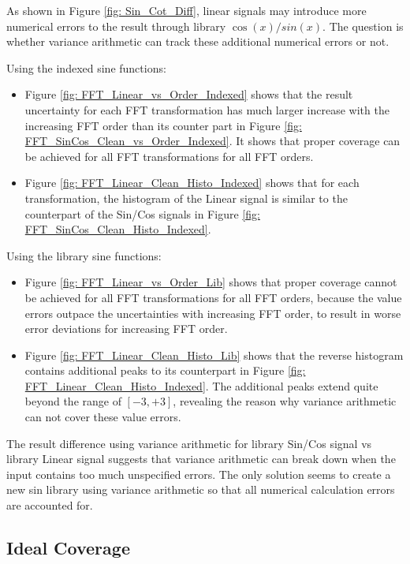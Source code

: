 \documentclass[twoside]{article}
\numberwithin{equation}{section}
\begin{document}
As shown in Figure \ref{fig: Sin_Cot_Diff}, linear signals may introduce more numerical errors to the result through library $\cos(x)/sin(x)$.
The question is whether variance arithmetic can track these additional numerical errors or not.

Using the indexed sine functions:
\begin{itemize}
\item Figure \ref{fig: FFT_Linear_vs_Order_Indexed} shows that the result uncertainty for each FFT transformation has much larger increase with the increasing FFT order than its counter part in Figure \ref{fig: FFT_SinCos_Clean_vs_Order_Indexed}.
It shows that proper coverage can be achieved for all FFT transformations for all FFT orders.

\item Figure \ref{fig: FFT_Linear_Clean_Histo_Indexed} shows that for each transformation, the histogram of the Linear signal is similar to the counterpart of the Sin/Cos signals in Figure \ref{fig: FFT_SinCos_Clean_Histo_Indexed}. 

\end{itemize}
 
Using the library sine functions:
\begin{itemize}
\item Figure \ref{fig: FFT_Linear_vs_Order_Lib} shows that proper coverage cannot be achieved for all FFT transformations for all FFT orders, because the value errors outpace the uncertainties with increasing FFT order, to result in worse error deviations for increasing FFT order.

\item Figure \ref{fig: FFT_Linear_Clean_Histo_Lib} shows that the reverse histogram contains additional peaks to its counterpart in Figure \ref{fig: FFT_Linear_Clean_Histo_Indexed}.
The additional peaks extend quite beyond the range of $[-3, +3]$, revealing the reason why variance arithmetic can not cover these value errors.

\end{itemize}

The result difference using variance arithmetic for library Sin/Cos signal vs library Linear signal suggests that variance arithmetic can break down when the input contains too much unspecified errors.
The only solution seems to create a new sin library using variance arithmetic so that all numerical calculation errors are accounted for.



\subsection{Ideal Coverage}
\end{document}
